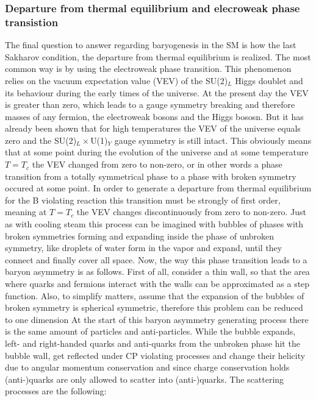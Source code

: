 \subsubsection{Departure from thermal equilibrium and elecroweak phase transistion}
 The final question to answer regarding baryogenesis in the SM is how the last Sakharov condition, the departure from thermal equilibrium is realized. The most common way is by using the electroweak phase transition. \newline\indent
This phenomenon relies on the vacuum expectation value (VEV) of the SU(2)$_L$ Higgs doublet and its behaviour during the early times of the universe. At the present day the VEV is greater than zero, which leads to a gauge symmetry breaking and therefore masses of any fermion, the electroweak bosons and the Higgs bososn. But it has already been shown \cite[p. 21]{Bernreuther:2002uj} that for high temperatures the VEV of the universe equals zero and the SU(2)$_L\times$U(1)$_Y$ gauge symmetry is still intact. This obviously means that at some point during the evolution of the universe and at some temperature $T=T_c$ the VEV changed from zero to non-zero, or in other words a phase transition from a totally symmetrical phase to a phase with broken symmetry occured at some point. In order to generate a departure from thermal equilibrium for the B violating reaction this transition must be strongly of first order, meaning at $T=T_c$ the VEV changes discontinuously from zero to non-zero. \newline\indent
Just as with cooling steam this process can be imagined with bubbles of phases with broken symmetries forming and expanding inside the phase of unbroken symmetry, like droplets of water form in the vapor and expand, until they connect and finally cover all space. Now, the way this phase transition leads to a baryon asymmetry is as follows. \newline\indent
First of all, consider a thin wall, so that the area where quarks and fermions interact with the walls can be approximated as a step function. Also, to simplify matters, assume that the expansion of the bubbles of broken symmetry is spherical symmetric, therefore this problem can be reduced to one dimension\cite[p. 33]{Bernreuther:2002uj} \newline\indent
At the start of this baryon asymmetry generating process there is the same amount of particles and anti-particles. \newline\indent
While the bubble expands, left- and right-handed quarks and anti-quarks from the unbroken phase hit the bubble wall, get reflected under CP violating processes and change their helicity due to angular momentum conservation and since charge conservation holds (anti-)quarks are only allowed to scatter into (anti-)quarks. The scattering processes are the following:
